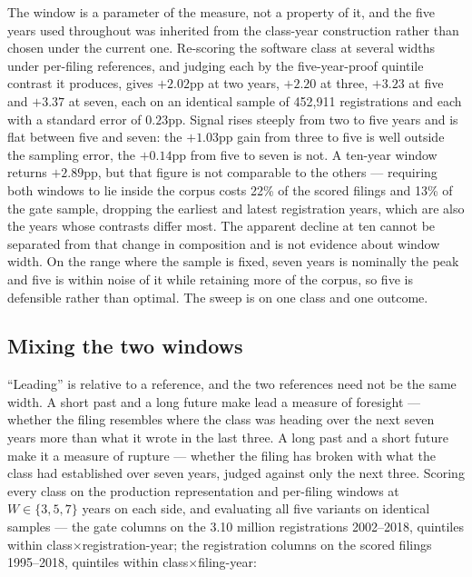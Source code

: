 The window is a parameter of the measure, not a property of it, and the five
years used throughout was inherited from the class-year construction rather
than chosen under the current one. Re-scoring the software class at several
widths under per-filing references, and judging each by the five-year-proof
quintile contrast it produces, gives $+2.02$pp at two years, $+2.20$ at
three, $+3.23$ at five and $+3.37$ at seven, each on an identical sample of
452{,}911 registrations and each with a standard error of $0.23$pp. Signal
rises steeply from two to five years and is flat between five and seven: the
$+1.03$pp gain from three to five is well outside the sampling error, the
$+0.14$pp from five to seven is not. A ten-year window returns $+2.89$pp,
but that figure is not comparable to the others --- requiring both windows
to lie inside the corpus costs 22\% of the scored filings and 13\% of the
gate sample, dropping the earliest and latest registration years, which are
also the years whose contrasts differ most. The apparent decline at ten
cannot be separated from that change in composition and is not evidence
about window width. On the range where the sample is fixed, seven years is
nominally the peak and five is within noise of it while retaining more of
the corpus, so five is defensible rather than optimal. The sweep is on one class
and one outcome.

\subsection{Mixing the two windows}\label{app:wmix}

``Leading'' is relative to a reference, and the two references need not be
the same width. A short past and a long future make lead a measure of
foresight --- whether the filing resembles where the class was heading over
the next seven years more than what it wrote in the last three. A long past
and a short future make it a measure of rupture --- whether the filing has
broken with what the class had established over seven years, judged against
only the next three. Scoring every class on the production representation
and per-filing windows at $W \in \{3, 5, 7\}$ years on each side, and
evaluating all five variants on identical samples --- the gate columns on
the 3.10 million registrations 2002--2018, quintiles within
class$\times$registration-year; the registration columns on the scored
filings 1995--2018, quintiles within class$\times$filing-year:

